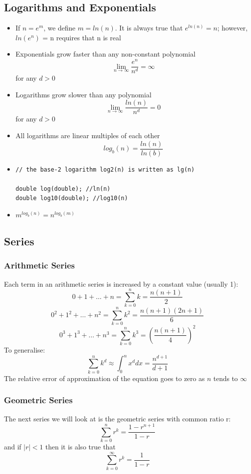 \documentclass[11pt]{article}
\theoremstyle{definition}
\begin{document}
\newpage

\subsection{Logarithms and Exponentials}
\begin{itemize}[label={--}]
\item If  $n = e^m$, we define
$m = ln(n)$. It is always true that $e^{ln(n)} = n$; however, $ln(e^n)$ = n requires that n is real 
\item Exponentials grow faster than any non-constant polynomial
$$\mathop {\lim }\limits_{n \to \infty}\frac{e^n}{n^d} = \infty$$ for any $d > 0$
\item Logarithms grow slower than any polynomial
$$\mathop {\lim }\limits_{n \to \infty}\frac{ln(n)}{n^d} = 0$$ for any $d > 0$
\item All logarithms are linear multiples of each other
$$log_{b}(n) = \frac{ln(n)}{ln(b)}$$
\item \begin{lstlisting}
// the base-2 logarithm log2(n) is written as lg(n)

double log(double); //ln(n)
double log10(double); //log10(n)
\end{lstlisting}
\item $m^{log_{b}(n)} = n^{log_{b}(m)}$
\end{itemize}
\newpage
\subsection{Series}
\subsubsection{Arithmetic Series}
Each term in an arithmetic series is increased by a constant value (usually 1):
$$0 + 1 + \ldots + n = \sum_{k=0}^{n} k = \frac{n(n+1)}{2}$$
$$0^2 + 1^2 + \ldots + n^2 = \sum_{k=0}^{n} k^2 = \frac{n(n+1)(2n+1)}{6}$$
$$0^3 + 1^3 + \ldots + n^3 = \sum_{k=0}^{n} k^3 = (\frac{n(n+1)}{4})^2$$
To generalise: $$\sum_{k=0}^{n} k^d \approx \int_{0}^{n} x^d dx = \frac{n^{d+1}}{d+1}$$
The relative error of approximation of the equation goes to zero as $n$ tends to $\infty$

\subsubsection{Geometric Series}
The next series we will look at is the geometric series with common ratio r:
$$\sum_{k=0}^{n} r^k = \frac{1-r^{n+1}}{1-r}$$
and if $|r| < 1$ then it is also true that
$$\sum_{k=0}^{\infty} r^k = \frac{1}{1-r}$$
\end{document}
